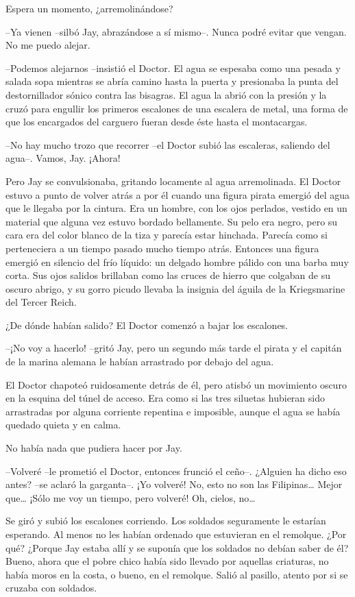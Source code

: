 {Espera un momento, ¿arremolinándose?}

{--Ya vienen --silbó Jay, abrazándose a sí mismo--. Nunca podré evitar
que vengan. No me puedo alejar.}

{--Podemos alejarnos --insistió el Doctor. El agua se espesaba como una
 pesada y salada sopa mientras se abría camino hasta la puerta y
 presionaba la punta del destornillador sónico contra las bisagras. El
 agua la abrió con la presión y la cruzó para engullir los primeros
 escalones de una escalera de metal, una forma de que los encargados del
carguero fueran desde éste hasta el montacargas.}

{--No hay mucho trozo que recorrer --el Doctor subió las escaleras,
saliendo del agua--. Vamos, Jay. ¡Ahora!}

{Pero Jay se convulsionaba, gritando locamente al agua arremolinada. El
 Doctor estuvo a punto de volver atrás a por él cuando una figura pirata
 emergió del agua que le llegaba por la cintura. Era un hombre, con los
 ojos perlados, vestido en un material que alguna vez estuvo bordado
 bellamente. Su pelo era negro, pero su cara era del color blanco de la
 tiza y parecía estar hinchada. Parecía como si perteneciera a un tiempo
 pasado mucho tiempo atrás. Entonces una figura emergió en silencio del
 frío líquido: un delgado hombre pálido con una barba muy corta. Sus ojos
 salidos brillaban como las cruces de hierro que colgaban de su oscuro
 abrigo, y su gorro picudo llevaba la insignia del águila de la
Kriegsmarine del Tercer Reich.}

{¿De dónde habían salido? El Doctor comenzó a bajar los escalones.}

{--¡No voy a hacerlo! --gritó Jay, pero un segundo más tarde el pirata y
 el capitán de la marina alemana le habían arrastrado por debajo del
agua.}

{El Doctor chapoteó ruidosamente detrás de él, pero atisbó un movimiento
 oscuro en la esquina del túnel de acceso. Era como si las tres siluetas
 hubieran sido arrastradas por alguna corriente repentina e imposible,
aunque el agua se había quedado quieta y en calma.}

{No había nada que pudiera hacer por Jay.}

{--Volveré --le prometió el Doctor, entonces frunció el ceño--. ¿Alguien
 ha dicho eso antes? --se aclaró la garganta--. ¡Yo volveré! No, esto no
 son las Filipinas\ldots{} Mejor que\ldots{} ¡Sólo me voy un tiempo, pero
 volveré! Oh, cielos, no\ldots{}}

{Se giró y subió los escalones corriendo. Los soldados seguramente le
 estarían esperando. Al menos no les habían ordenado que estuvieran en el
 remolque. ¿Por qué? ¿Porque Jay estaba allí y se suponía que los
 soldados no debían saber de él? Bueno, ahora que el pobre chico había
 sido llevado por aquellas criaturas, no había moros en la costa, o
 bueno, en el remolque. Salió al pasillo, atento por si se cruzaba con
soldados.}

